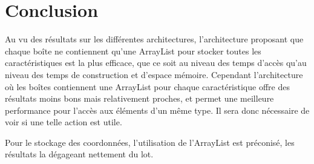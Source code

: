 \section{Conclusion}
Au vu des résultats sur les différentes architectures, l'architecture proposant que chaque boîte ne contiennent qu'une ArrayList pour stocker toutes les caractéristiques est la plus efficace, que ce soit au niveau des temps d'accès qu'au niveau des temps de construction et d'espace mémoire. Cependant l'architecture où les boîtes contiennent une ArrayList pour chaque caractéristique offre des résultats moins bons mais relativement proches, et permet une meilleure performance pour l'accès aux éléments d'un même type. Il sera donc nécessaire de voir si une telle action est utile.

Pour le stockage des coordonnées, l'utilisation de l'ArrayList est préconisé, les résultats la dégageant nettement du lot. 